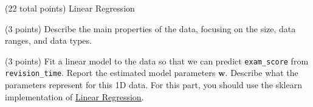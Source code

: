 \documentclass[12pt]{article}
\begin{document}
\maketitle
\thispagestyle{empty}







\clearpage

\begin{question}{(22 total points) Linear Regression}




%
%
\begin{subquestion}{(3 points) Describe the main properties of the data, focusing on the size, data ranges, and data types.   
}





\end{subquestion}




%
%
\begin{subquestion}{(3 points) Fit a linear model to the data so that we can predict \texttt{exam\_score} from \texttt{revision\_time}. 
Report the estimated model parameters $\mathbf{w}$. 
Describe what the parameters represent for this 1D data. 
For this part, you should use the sklearn implementation of \href{https://scikit-learn.org/0.19/modules/generated/sklearn.linear_model.LinearRegression.html}{Linear Regression}.\\
}



\end{subquestion}
\end{question}
\end{document}
